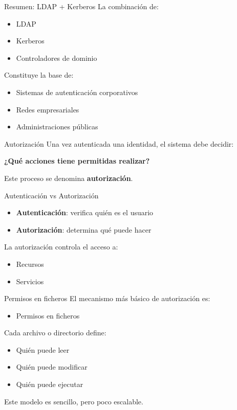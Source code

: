 \documentclass{beamer}
\begin{document}
\begin{frame}{Resumen: LDAP + Kerberos}
La combinación de:
\begin{itemize}
    \item LDAP
    \item Kerberos
    \item Controladores de dominio
\end{itemize}

\vspace{0.3cm}
Constituye la base de:
\begin{itemize}
    \item Sistemas de autenticación corporativos
    \item Redes empresariales
    \item Administraciones públicas
\end{itemize}
\end{frame}

\begin{frame}{Autorización}
Una vez autenticada una identidad, el sistema debe decidir:
\begin{center}
\textbf{¿Qué acciones tiene permitidas realizar?}
\end{center}

\vspace{0.3cm}
Este proceso se denomina \textbf{autorización}.
\end{frame}

\begin{frame}{Autenticación vs Autorización}
\begin{itemize}
    \item \textbf{Autenticación}: verifica quién es el usuario
    \item \textbf{Autorización}: determina qué puede hacer
\end{itemize}

\vspace{0.3cm}
La autorización controla el acceso a:
\begin{itemize}
    \item Recursos
    \item Servicios
\end{itemize}
\end{frame}

\begin{frame}{Permisos en ficheros}
El mecanismo más básico de autorización es:
\begin{itemize}
    \item Permisos en ficheros
\end{itemize}

\vspace{0.3cm}
Cada archivo o directorio define:
\begin{itemize}
    \item Quién puede leer
    \item Quién puede modificar
    \item Quién puede ejecutar
\end{itemize}

\vspace{0.2cm}
Este modelo es sencillo, pero poco escalable.
\end{frame}
\end{document}
